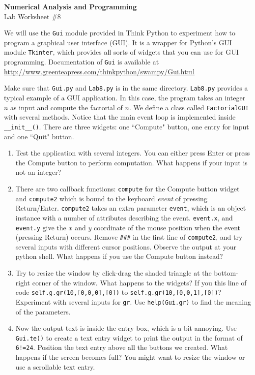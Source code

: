 \documentclass[12pt]{article}
\begin{document}
\begin{center}
\Large
\textbf{Numerical Analysis and Programming}\\
\large
Lab Worksheet \#8\\
\end{center}
We will use the \verb|Gui| module provided in Think Python to experiment how to program a graphical user interface (GUI).
It is a wrapper for Python's  GUI module \verb!Tkinter!, which provides all sorts of widgets that you can use for GUI programming. 
Documentation of \verb!Gui! is available at \url{http://www.greenteapress.com/thinkpython/swampy/Gui.html}

Make sure that  \verb|Gui.py| and \verb!Lab8.py! is in the same directory. \verb!Lab8.py! provides a typical example of a GUI application. In this case, the program takes an integer $n$ as input and compute the factorial of $n$. We define a class called \verb!FactorialGUI! with several methods. Notice that the main event loop is implemented inside  \verb!__init__()!.  There are three widgets: one ``Compute" button, one entry for input and one ``Quit" button.  

 
\begin{enumerate}
\item Test the application with several integers. You can either press Enter or press the Compute button to perform computation. What happens if your input is not an integer?
\item  There are two callback functions: \verb!compute! for the Compute button widget and \verb!compute2! which is bound to the keyboard \textit{event} of pressing Return/Enter. \verb!compute2! takes an extra parameter \verb!event!, which is an object instance with a number of attributes describing the event. \verb!event.x!, and \verb!event.y! give the $x$ and $y$ coordinate of the mouse position when the event (pressing Return) occurs. Remove \verb!###! in the first line of  \verb!compute2!, and try several inputs with different cursor positions. Observe the output at your python shell.  What happens if you use the Compute button instead?    
\item Try to resize the window by click-drag the shaded triangle at the bottom-right corner of the window. What happens to the widgets? If you this line of code  \verb!self.g.gr(10,[0,0,0],[0])! to \verb!self.g.gr(10,[0,0,1],[0])!? Experiment with several inputs for \verb!gr!.
Use \verb!help(Gui.gr)! to find the meaning of the parameters.
\item Now the output text is inside the entry box, which is a bit annoying. Use \verb!Gui.te()! to create a text entry widget to print the output in the format of \verb|6!=24|. Position the text entry above  all the buttons we created. What happens if the screen becomes full? You might want to resize the window or use a scrollable text entry. 
\end{enumerate}
\end{document}

